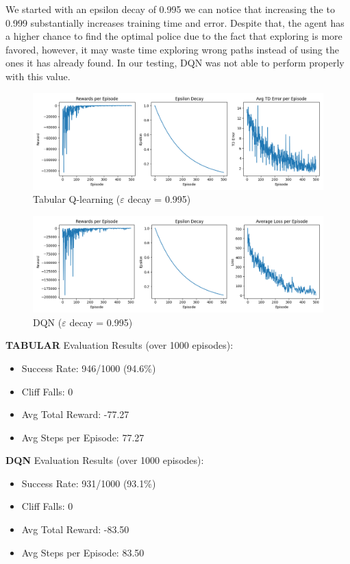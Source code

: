 \documentclass[a4paper,12pt]{article}
\begin{document}
\noindent We started with an epsilon decay of 0.995 we can notice that increasing the to 0.999 substantially increases training time and error. Despite that, the agent has a higher chance to find the optimal police due to the fact that exploring is more favored, however, it may waste time exploring wrong paths instead of using the ones it has already found. In our testing, DQN was not able to perform properly with this value.

\begin{figure}[H]
    \centering
    \includegraphics[width=\linewidth]{2_32_0995_64_slip_tab.png}
    \caption{Tabular Q-learning ($\varepsilon$ decay = 0.995)}
\end{figure}
\begin{figure}[H]
    \centering
    \includegraphics[width=\linewidth]{2_32_0995_64_slip_dqn.png}
    \caption{DQN ($\varepsilon$ decay = 0.995)}
\end{figure}
\noindent \textbf{TABULAR} Evaluation Results (over 1000 episodes):
\begin{itemize}
    \item Success Rate: 946/1000 (94.6\%)
    \item Cliff Falls: 0
    \item Avg Total Reward: -77.27
    \item Avg Steps per Episode: 77.27
\end{itemize}
\textbf{DQN} Evaluation Results (over 1000 episodes):
\begin{itemize}
    \item Success Rate: 931/1000 (93.1\%)
    \item Cliff Falls: 0
    \item Avg Total Reward: -83.50
    \item Avg Steps per Episode: 83.50
\end{itemize}
\end{document}
